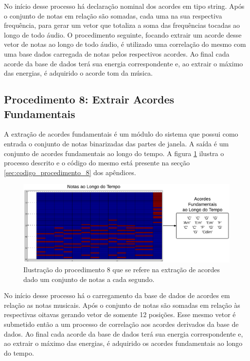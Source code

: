 No início desse processo há declaração nominal dos acordes em tipo string. Após o conjunto de notas em relação são somadas, cada uma na sua respectiva frequência, para gerar um vetor que totaliza a soma das frequências tocadas ao longo de todo áudio. O procedimento seguinte, focando extrair um acorde desse vetor de notas ao longo de todo áudio, é utilizado uma correlação do mesmo com uma base dados carregada de notas pelos respectivos acordes. Ao final cada acorde da base de dados terá sua energia correspondente e, ao extrair o máximo das energias, é adquirido o acorde tom da música.

\subsection{Procedimento 8: Extrair Acordes Fundamentais}
\label{subsec:procedimento_8}

A extração de acordes fundamentais é um módulo do sistema que possui como entrada o conjunto de notas binarizadas das partes de janela. A saída é um conjunto de acordes fundamentais ao longo do tempo. A figura \ref{fig:procedimento_8} ilustra o processo descrito e o código do mesmo está presente na secção \ref{sec:codigo_procedimento_8} dos apêndices.

\begin{figure}[h] 
  \centering
    \includegraphics[keepaspectratio=true, scale=0.55]{figuras/procedimento_8}
    \caption{Ilustração do procedimento 8 que se refere na extração de acordes dado um conjunto de notas a cada segundo.}
    \label{fig:procedimento_8}
\end{figure}


No início desse processo há o carregamento da base de dados de acordes em relação as notas musicais. Após o conjunto de notas são somadas em relação às respectivas oitavas gerando vetor de somente 12 posições. Esse mesmo vetor é submetido então a um processo de correlação aos acordes derivados da base de dados. Ao final cada acorde da base de dados terá sua energia correspondente e, ao extrair o máximo das energias, é adquirido os acordes fundamentais ao longo do tempo.

